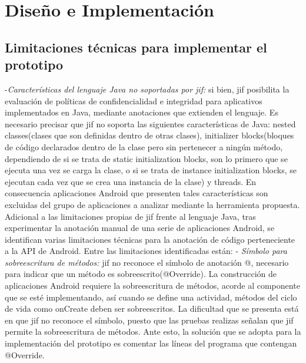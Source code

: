 \label{ch:desing}
\chapter{Diseño e Implementación}

\section{Limitaciones técnicas para implementar el prototipo}
-\textit{Características del lenguaje Java no soportadas por jif:}\newline
si bien, jif posibilita la evaluación de políticas de confidencialidad
e integridad para aplicativos implementados en Java, mediante anotaciones que
extienden el lenguaje. Es necesario precisar que jif no soporta las siguientes
características de Java: nested classes(clases que son definidas dentro de
otras clases), initializer blocks(bloques de código declarados dentro de la
clase pero sin pertenecer a ningún método, dependiendo de si se trata de static
initialization blocks, son lo primero que se ejecuta una vez se carga la clase,
o si se trata de instance initialization blocks, se ejecutan cada vez que se crea
una instancia de la clase) y threads.\newline 
En consecuencia aplicaciones Android que presenten tales características son
excluidas del grupo de aplicaciones a analizar mediante la herramienta propuesta.\newline 
Adicional a las limitaciones propias de jif frente al lenguaje Java, tras
experimentar la anotación manual de una serie de aplicaciones Android, se
identifican varias limitaciones técnicas para la anotación de código
perteneciente a la API de Android. Entre las limitaciones identificadas están:\newline 
- \textit{Símbolo para sobreescritura de métodos:}\newline
jif no reconoce el símbolo de anotación @, necesario para indicar que un método
es sobreescrito(@Override). La construcción de aplicaciones Android requiere la
sobreescritura de métodos, acorde al componente que se esté implementando, así
cuando se define una actividad, métodos del ciclo de vida como onCreate deben
ser sobreescritos. La dificultad que se presenta está en que jif no reconoce el
símbolo, puesto que las pruebas realizas señalan que jif permite la
sobreescritura de métodos. Ante esto, la solución que se adopta para la
implementación del prototipo es comentar las líneas del programa que contengan
@Override.\newline 
